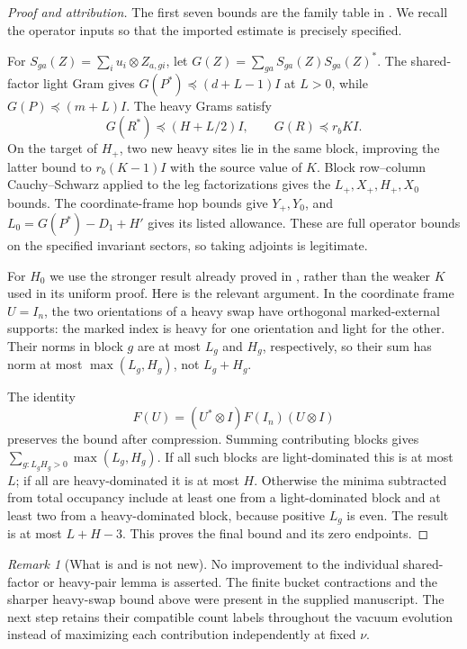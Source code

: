 \documentclass[11pt]{article}
\numberwithin{equation}{section}
\theoremstyle{definition}\newtheorem{definition}[theorem]{Definition}
\theoremstyle{remark}\newtheorem{remark}[theorem]{Remark}
\begin{document}
\begin{proof}[Proof and attribution]
The first seven bounds are the family table in \cite[direct SparseStack appendix, ``Collected Grams and parity'' and ``All channel bounds'']{Framework}. We recall the operator inputs so that the imported estimate is precisely specified.

For $S_{ga}(Z)=\sum_i u_i\otimes Z_{a,gi}$, let $G(Z)=\sum_{ga}S_{ga}(Z)S_{ga}(Z)^*$. The shared-factor light Gram gives $G(P^*)\preceq(d+L-1)I$ at $L>0$, while $G(P)\preceq(m+L)I$. The heavy Grams satisfy
\[
 G(R^*)\preceq(H+L/2)I,\qquad G(R)\preceq r_b K I.
\]
On the target of $H_+$, two new heavy sites lie in the same block, improving the latter bound to $r_b(K-1)I$ with the source value of $K$. Block row--column Cauchy--Schwarz applied to the leg factorizations gives the $L_+,X_+,H_+,X_0$ bounds. The coordinate-frame hop bounds give $Y_+,Y_0$, and $L_0=G(P^*)-D_1+H'$ gives its listed allowance. These are full operator bounds on the specified invariant sectors, so taking adjoints is legitimate.

For $H_0$ we use the stronger result already proved in \cite[appendix ``Exact bucket-sector calculations'', marked-support heavy-swap proposition]{Framework}, rather than the weaker $K$ used in its uniform proof. Here is the relevant argument. In the coordinate frame $U=I_n$, the two orientations of a heavy swap have orthogonal marked-external supports: the marked index is heavy for one orientation and light for the other. Their norms in block $g$ are at most $L_g$ and $H_g$, respectively, so their sum has norm at most $\max(L_g,H_g)$, not $L_g+H_g$.

The identity
\[
 F(U)=(U^*\otimes I)F(I_n)(U\otimes I)
\]
preserves the bound after compression. Summing contributing blocks gives $\sum_{g:L_gH_g>0}\max(L_g,H_g)$. If all such blocks are light-dominated this is at most $L$; if all are heavy-dominated it is at most $H$. Otherwise the minima subtracted from total occupancy include at least one from a light-dominated block and at least two from a heavy-dominated block, because positive $L_g$ is even. The result is at most $L+H-3$. This proves the final bound and its zero endpoints.
\end{proof}

\begin{remark}[What is and is not new]
No improvement to the individual shared-factor or heavy-pair lemma is asserted. The finite bucket contractions and the sharper heavy-swap bound above were present in the supplied manuscript. The next step retains their compatible count labels throughout the vacuum evolution instead of maximizing each contribution independently at fixed $\nu$.
\end{remark}
\end{document}
